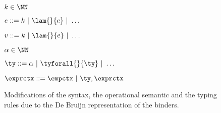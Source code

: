\begin{figure}[ht]

  $k \in \NN$

  $e ::= k\ |\ \lam{}{e}\ |\ \ldots$

  $v ::= k\ |\ \lam{}{e}\ |\ \ldots$

  $\alpha \in \NN$

  $\ty ::= \alpha\ |\ \tyforall{}{\ty}\ |\ \ldots$

  $\exprctx ::= \empctx\ |\ \ty,\exprctx$

  \centering

  \caption{\label{fig:opsemDB} Modifications of the syntax, the operational semantic and the typing rules due to the De Bruijn representation of the binders.}
\end{figure}
